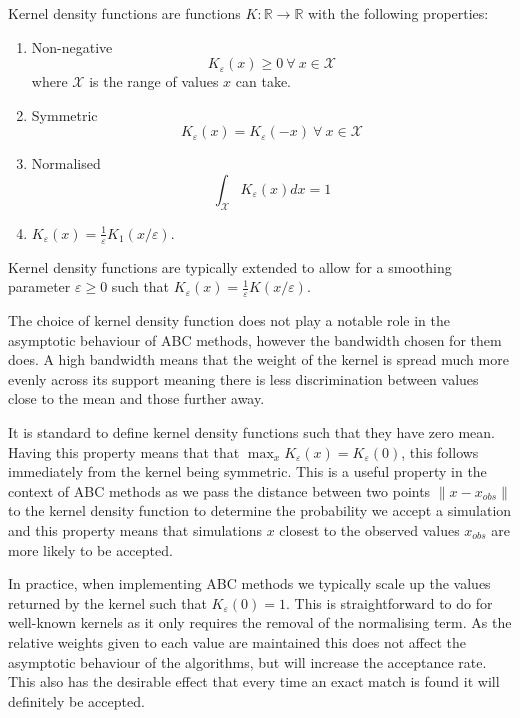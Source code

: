 \documentclass[11pt,a4paper]{article}
\theoremstyle{break}
\begin{document}
  \begin{box_definition}
    Kernel density functions are functions $K:\mathbb{R}\to\mathbb{R}$ with the following properties:
    \begin{enumerate}
      \item Non-negative
      \[ K_\varepsilon(x)\geq0\ \forall\ x\in\mathcal{X} \]
      where $\mathcal{X}$ is the range of values $x$ can take.
      \item Symmetric
      \[ K_\varepsilon(x)=K_\varepsilon(-x)\ \forall\ x\in\mathcal{X} \]
      \item Normalised
      \[ \int_{\mathcal{X}}K_\varepsilon(x)dx=1 \]
      \item $K_\varepsilon(x)=\frac1\varepsilon K_1(x/\varepsilon)$.
    \end{enumerate}
    \noindent Kernel density functions are typically extended to allow for a smoothing parameter $\varepsilon\geq0$ such that $K_\varepsilon(x)=\frac1\varepsilon K(x/\varepsilon)$.
  \end{box_definition}

  \par The choice of kernel density function does not play a notable role in the asymptotic behaviour of ABC methods, however the bandwidth chosen for them does. A high bandwidth means that the weight of the kernel is spread much more evenly across its support meaning there is less discrimination between values close to the mean and those further away.

  \par It is standard to define kernel density functions such that they have zero mean. Having this property means that that $\max_xK_\varepsilon(x)=K_\varepsilon(0)$, this follows immediately from the kernel being symmetric. This is a useful property in the context of ABC methods as we pass the distance between two points $\|x-x_{obs}\|$ to the kernel density function to determine the probability we accept a simulation and this property means that simulations $x$ closest to the observed values $x_{obs}$ are more likely to be accepted.

  \par In practice, when implementing ABC methods we typically scale up the values returned by the kernel such that $K_\varepsilon(0)=1$. This is straightforward to do for well-known kernels as it only requires the removal of the normalising term. As the relative weights given to each value are maintained this does not affect the asymptotic behaviour of the algorithms, but will increase the acceptance rate. This also has the desirable effect that every time an exact match is found it will definitely be accepted.
\end{document}

